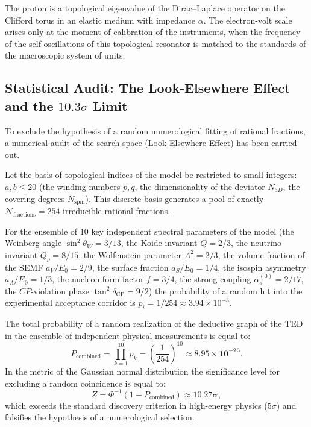 \documentclass[11pt,a4paper]{article}
\theoremstyle{definition}
\theoremstyle{remark}
\begin{document}
The proton is a topological eigenvalue of the Dirac--Laplace operator on the Clifford torus in an elastic medium with impedance $\alpha$. The electron-volt scale arises only at the moment of calibration of the instruments, when the frequency of the self-oscillations of this topological resonator is matched to the standards of the macroscopic system of units.

\subsection*{Statistical Audit: The Look-Elsewhere Effect and the $10.3\sigma$ Limit}

To exclude the hypothesis of a random numerological fitting of rational fractions, a numerical audit of the search space (Look-Elsewhere Effect) has been carried out.

Let the basis of topological indices of the model be restricted to small integers: $a, b \le 20$ (the winding numbers $p, q$, the dimensionality of the deviator $N_{3D}$, the covering degrees $N_{\mathrm{spin}}$). This discrete basis generates a pool of exactly $\mathcal{N}_{\mathrm{fractions}} = 254$ irreducible rational fractions.

For the ensemble of 10 key independent spectral parameters of the model (the Weinberg angle $\sin^2\theta_W = 3/13$, the Koide invariant $Q = 2/3$, the neutrino invariant $Q_\nu = 8/15$, the Wolfenstein parameter $A^2 = 2/3$, the volume fraction of the SEMF $a_V/E_0 = 2/9$, the surface fraction $a_S/E_0 = 1/4$, the isospin asymmetry $a_A/E_0 = 1/3$, the nucleon form factor $f = 3/4$, the strong coupling $\alpha_s^{(0)} = 2/17$, the $CP$-violation phase $\tan^2\delta_{\mathrm{CP}} = 9/2$) the probability of a random hit into the experimental acceptance corridor is $p_i = 1 / 254 \approx 3.94 \times 10^{-3}$.

The total probability of a random realization of the deductive graph of the TED in the ensemble of independent physical measurements is equal to:
\begin{equation}
    P_{\mathrm{combined}} = \prod_{k=1}^{10} p_k = \left( \frac{1}{254} \right)^{10} \approx \mathbf{8.95 \times 10^{-25}}.
    \label{eq:look_elsewhere_p_value}
\end{equation}
In the metric of the Gaussian normal distribution the significance level for excluding a random coincidence is equal to:
\begin{equation}
    Z = \Phi^{-1}(1 - P_{\mathrm{combined}}) \approx \mathbf{10.27\sigma},
    \label{eq:significance_ten_sigma}
\end{equation}
which exceeds the standard discovery criterion in high-energy physics ($5\sigma$) and falsifies the hypothesis of a numerological selection.
\end{document}
